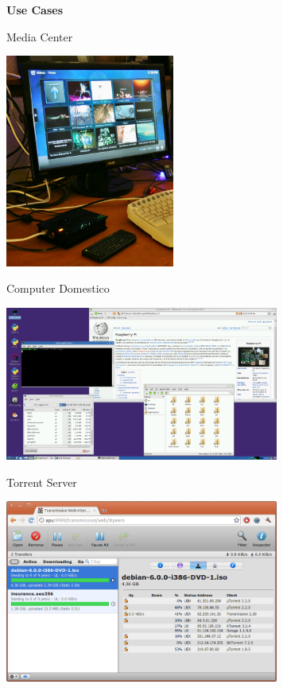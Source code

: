 \documentclass[xcolor=svgnames,11pt]{beamer}
\begin{document}
\begin{frame}{}
\begin{center}
\begin{Huge}
{\color{green_raspi} \textbf{Use Cases}}
\end{Huge}
\end{center}

\end{frame}

\begin{frame}{Media Center}
\begin{center}
\includegraphics[height=7cm]{uc/media.jpg}
\end{center}
\end{frame}

\begin{frame}{Computer Domestico}
\begin{center}
\includegraphics[width=9cm]{uc/pc.png}
\end{center}
\end{frame}

\begin{frame}{Torrent Server}
\begin{center}
\includegraphics[width=9cm]{uc/torrent.png}
\end{center}
\end{frame}
\end{document}

